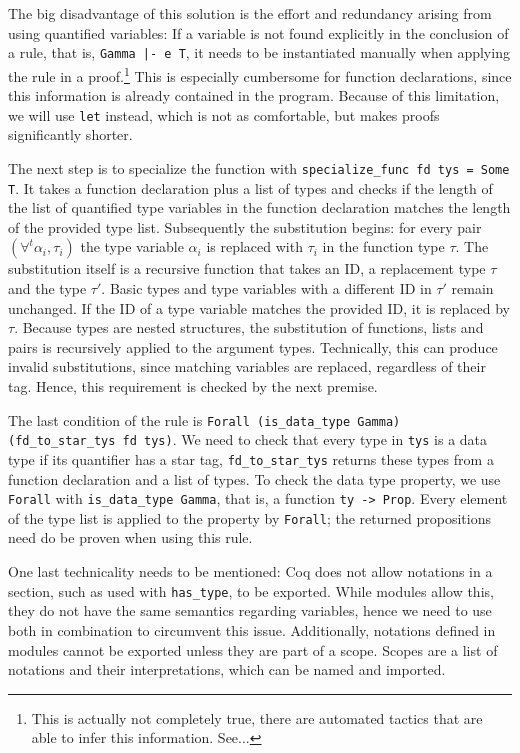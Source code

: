 \documentclass[fleqn]{scrreprt}
\newcommand{\todo}[1]{\marginpar{\textbf{TODO:} #1}}
\newcommand{\coqinline}[1]{\texttt{#1}}
\begin{document}
\par
 The big disadvantage of this solution is the effort and redundancy arising from using quantified variables: If a variable is not found explicitly in the conclusion of a rule, that is, \coqinline{Gamma |- e \in T}, it needs to be instantiated manually when applying the rule in a proof.\footnote{This is actually not completely true, there are automated tactics that are able to infer this information. See...} \todo{Verlinkung in Fußnote} This is especially cumbersome for function declarations, since this information is already contained in the program. Because of this limitation, we will use \coqinline{let} instead, which is not as comfortable, but makes proofs significantly shorter.
 \par
 The next step is to specialize the function with \coqinline{specialize_func fd tys = Some T}. It takes a function declaration plus a list of types and checks if the length of the list of quantified type variables in the function declaration matches the length of the provided type list. Subsequently the substitution begins: for every pair $(\forall^{t}\alpha_{i}, \tau_{i})$ the type variable $\alpha_{i}$ is replaced with $\tau_{i}$ in the function type $\tau$. The substitution itself is a recursive function that takes an ID, a replacement type $\tau$ and the type $\tau'$. Basic types and type variables with a different ID in $\tau'$ remain unchanged. If the ID of a type variable matches the provided ID, it is replaced by $\tau$. Because types are nested structures, the substitution of functions, lists and pairs is recursively applied to the argument types. Technically, this can produce invalid substitutions, since matching variables are replaced, regardless of their tag. Hence, this requirement is checked by the next premise.
 \par
 The last condition of the rule is \coqinline{Forall (is_data_type Gamma) (fd_to_star_tys fd tys)}. We need to check that every type in \coqinline{tys} is a data type if its quantifier has a star tag, \coqinline{fd_to_star_tys} returns these types from a function declaration and a list of types. To check the data type property, we use \coqinline{Forall} with \coqinline{is_data_type Gamma}, that is, a function \coqinline{ty -> Prop}. Every element of the type list is applied to the property by \coqinline{Forall}; the returned propositions need do be proven when using this rule.
 \par
 One last technicality needs to be mentioned: Coq does not allow notations in a section, such as used with \coqinline{has_type}, to be exported. While modules allow this, they do not have the same semantics regarding variables, hence we need to use both in combination to circumvent this issue. Additionally, notations defined in modules cannot be exported unless they are part of a scope. Scopes are a list of notations and their interpretations, which can be named and imported.
\end{document}
